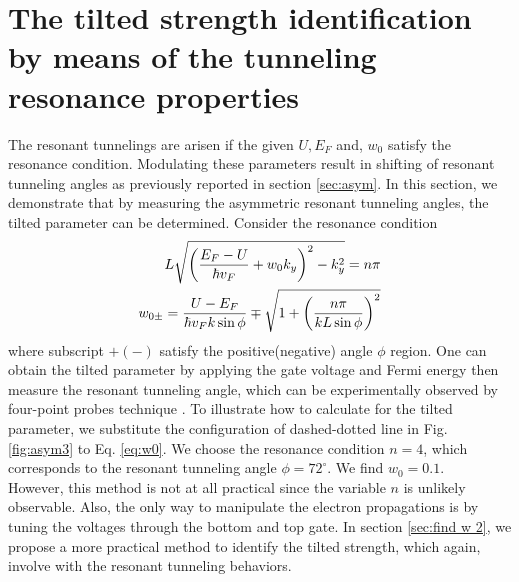 \section{The tilted strength identification by means of the tunneling resonance properties} \label{sec:find w}
    The resonant tunnelings are arisen if the given $U, E_F$ and, $w_0$ satisfy the resonance condition.
    Modulating these parameters result in shifting of resonant tunneling angles as previously reported in section \ref{sec:asym}.
    In this section, we demonstrate that by measuring the asymmetric resonant tunneling angles, the tilted parameter can be determined.
    Consider the resonance condition
    \begin{align} \label{eq:w0}
        L \sqrt{\left( \frac{E_F-U}{\hbar v_F}+ w_0 k_y \right)^2 -k_y^2} = n \pi \notag\\
        w_{0 \pm} = \frac{U-E_F}{\hbar v_F k \sin{\phi}}\mp \sqrt{1+\left(\frac{n \pi}{k L \sin{\phi}}\right)^2}
    \end{align}
    where subscript $+(-)$ satisfy the positive(negative) angle $\phi$ region.
    One can obtain the tilted parameter by applying the gate voltage and Fermi energy then measure the resonant tunneling angle, which can be experimentally observed
    by four-point probes technique \cite{Rahman2015}.
    To illustrate how to calculate for the tilted parameter, we substitute the configuration of dashed-dotted line in Fig. \ref{fig:asym3} to Eq. \ref{eq:w0}.
    We choose the resonance condition $n=4$, which corresponds to the resonant tunneling angle $\phi = 72^{\circ}$. We find $w_0 = 0.1$.\\
    
    However, this method is not at all practical since the variable $n$ is unlikely observable.
    Also, the only way to manipulate the electron propagations is by tuning the voltages through the bottom and top gate.
    In section \ref{sec:find w 2}, we propose a more practical method to identify the tilted strength, which again, involve with the resonant tunneling behaviors.

